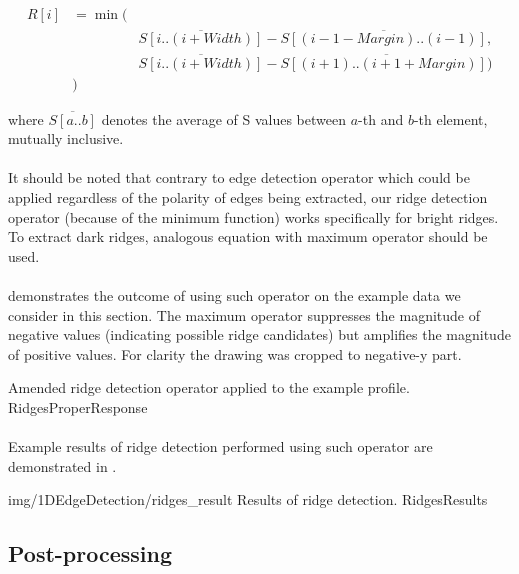 \begin{eqnarray*}
R[i] & = \min( & \\
	& & \overline{S[i..(i+Width)]}-\overline{S[(i-1-Margin)..(i-1)]}, \\
	& & \overline{S[i..(i+Width)]}-\overline{S[(i+1)..(i+1+Margin)])} \\
	& ) &
\end{eqnarray*}

where $\overline{S[a..b]}$ denotes the average of S values between $a$-th and $b$-th element, mutually inclusive.

\paragraph*{}
It should be noted that contrary to edge detection operator which could be applied regardless of the polarity of edges being extracted, our ridge detection operator (because of the minimum function) works specifically for bright ridges. To extract dark ridges, analogous equation with maximum operator should be used.

\paragraph*{}
 demonstrates the outcome of using such operator on the example data we consider in this section. The maximum operator suppresses the magnitude of negative values (indicating possible ridge candidates) but amplifies the magnitude of positive values. For clarity the drawing was cropped to negative-y part.

\profileFigure
{
}
{Amended ridge detection operator applied to the example profile.}
{RidgesProperResponse}

\paragraph*{}
Example results of ridge detection performed using such operator are demonstrated in .

\oneFigure
{img/1DEdgeDetection/ridges_result}
{Results of ridge detection.}
{RidgesResults}
{\basicWidth}

\subsection{Post-processing}

